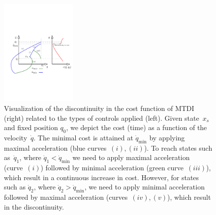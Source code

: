 \documentclass[letterpaper, 10 pt, conference]{ieeeconf}  %
\begin{document}

\begin{figure}[tb]
  \centering
  	\includegraphics[height = 5.25cm ]{fig/cost_discontinuity.pdf}
  \caption{
    \captionstyle
  	Visualization of the discontinuity in the cost function of MTDI (right) related to the types of controls applied (left). 
  	Given state~$x_s$ and fixed position $q_0$, we depict the cost (time) as a function of the velocity~$\dot{q}$. 
  	The minimal cost is attained at $\dot{q}_{\min}$ by applying maximal acceleration (blue curves~$(i), (ii)$). 
  	To reach states such as~$\dot{q}_1$, where $\dot{q}_1 < \dot{q}_{\min}$ we need to apply maximal acceleration (curve~$(i)$) followed by minimal acceleration (green curve~$(iii)$), which result in a continuous increase in cost.
  	However, for states such as $\dot{q}_2$, where $\dot{q}_2 > \dot{q}_{\min}$, we need to apply minimal acceleration  followed by maximal acceleration (curves~$(iv), (v)$), which result in the discontinuity.
  	}
   	\label{fig:discont}
\end{figure}
\end{document}
